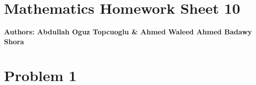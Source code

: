 \documentclass{article}
\begin{document}
\section*{\huge Mathematics Homework Sheet 10}
\begin{flushright}
   \textbf{Authors: Abdullah Oguz Topcuoglu \& Ahmed Waleed Ahmed Badawy Shora}
\end{flushright}


\section*{Problem 1}
\end{document}
